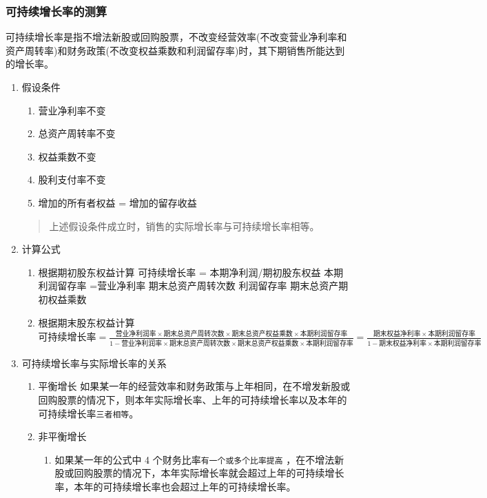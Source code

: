 \documentclass[11pt]{article}
\begin{document}
\subsubsection{可持续增长率的测算}
\label{sec:orge542965}
可持续增长率是指不增法新股或回购股票，不改变经营效率(不改变营业净利率和资产周转率)和财务政策(不改变权益乘数和利润留存率)时，其下期销售所能达到的增长率。
\begin{enumerate}
\item 假设条件
\label{sec:org310d928}
\begin{enumerate}
\item 营业净利率不变
\item 总资产周转率不变
\item 权益乘数不变
\item 股利支付率不变
\item 增加的所有者权益 = 增加的留存收益
\end{enumerate}
\begin{quote}
上述假设条件成立时，销售的实际增长率与可持续增长率相等。
\end{quote}
\item 计算公式
\label{sec:orged4e414}
\begin{enumerate}
\item 根据期初股东权益计算
\label{sec:orgc2ff74a}
可持续增长率 = 本期净利润/期初股东权益 \texttimes{} 本期利润留存率
=营业净利率 \texttimes{} 期末总资产周转次数 \texttimes{} 利润留存率 \texttimes{} 期末总资产期初权益乘数
\item 根据期末股东权益计算
\label{sec:orgdb761d4}
\(可持续增长率=\frac{营业净利润率\times 期末总资产周转次数 \times 期末总资产权益乘数 \times 本期利润留存率}{1-营业净利润率\times 期末总资产周转次数 \times 期末总资产权益乘数 \times 本期利润留存率}=\frac{期末权益净利率\times 本期利润留存率}{1-期末权益净利率\times 本期利润留存率}\)
\end{enumerate}
\item 可持续增长率与实际增长率的关系
\label{sec:org7f71c33}
\begin{enumerate}
\item 平衡增长
\label{sec:org1dcdac6}
如果某一年的经营效率和财务政策与上年相同，在不增发新股或回购股票的情况下，则本年实际增长率、上年的可持续增长率以及本年的可持续增长率\texttt{三者相等}。
\item 非平衡增长
\label{sec:orgb858a79}
\begin{enumerate}
\item 如果某一年的公式中 4 个财务比率\texttt{有一个或多个比率提高} ，在不增法新股或回购股票的情况下，本年实际增长率就会超过上年的可持续增长率，本年的可持续增长率也会超过上年的可持续增长率。

\end{enumerate}
\end{enumerate}
\end{enumerate}
\end{document}
